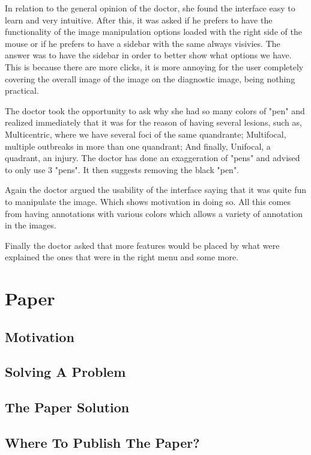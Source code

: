 In relation to the general opinion of the doctor, she found the interface easy to learn and very intuitive. After this, it was asked if he prefers to have the functionality of the image manipulation options loaded with the right side of the mouse or if he prefers to have a sidebar with the same always visivies. The answer was to have the sidebar in order to better show what options we have. This is because there are more clicks, it is more annoying for the user completely covering the overall image of the image on the diagnostic image, being nothing practical.

The doctor took the opportunity to ask why she had so many colors of "pen" and realized immediately that it was for the reason of having several lesions, such as, Multicentric, where we have several foci of the same quandrante; Multifocal, multiple outbreaks in more than one quandrant; And finally, Unifocal, a quadrant, an injury. The doctor has done an exaggeration of "pens" and advised to only use 3 "pens". It then suggests removing the black "pen".

Again the doctor argued the usability of the interface saying that it was quite fun to manipulate the image. Which shows motivation in doing so.
All this comes from having annotations with various colors which allows a variety of annotation in the images.

Finally the doctor asked that more features would be placed by what were explained the ones that were in the right menu and some more.

\section{Paper}

\subsection{Motivation}

\subsection{Solving A Problem}

\subsection{The Paper Solution}

\subsection{Where To Publish The Paper?}

